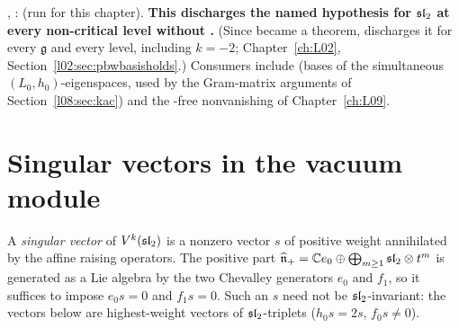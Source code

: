 \begin{status}
\allowbreak{}\allowbreak{},
\allowbreak{}\allowbreak{}\allowbreak{}: \lean{[propext, Classical.}\allowbreak{}\allowbreak\lean{sound]} (run for this chapter). \textbf{This discharges the named hypothesis 
for $\mathfrak{sl}_2$ at every non-critical level without .} (Since  became a theorem,
 discharges it for every $\mathfrak g$ and every level, including $k=-2$; Chapter~\ref{ch:L02},
Section~\ref{l02:sec:pbwbasisholds}.) Consumers include
 (bases of the simultaneous $(L_0,h_0)$-eigenspaces, used by the
Gram-matrix arguments of Section~\ref{l08:sec:kac}) and the -free nonvanishing
\allowbreak{}\allowbreak{}\allowbreak{} of Chapter~\ref{ch:L09}.
\end{status}
\section{Singular vectors in the vacuum module}\label{l08:sec:singular}

A \emph{singular vector} of $V^k(\mathfrak{sl}_2)$ is a nonzero vector $s$ of positive weight annihilated by
the affine raising operators. The positive part $\widehat{\mathfrak n}_+ = {\mathbb{C}} e_0\oplus\bigoplus_{m\ge1}
\mathfrak{sl}_2\otimes t^m$ is generated as a Lie algebra by the two Chevalley generators $e_0$ and $f_1$, so it
suffices to impose $e_0s = 0$ and $f_1s=0$. Such an $s$ need not be $\mathfrak{sl}_2$-invariant: the vectors
below are highest-weight vectors of $\mathfrak{sl}_2$-triplets ($h_0s = 2s$, $f_0s\ne0$).

